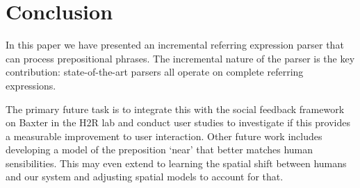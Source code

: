 \documentclass[letterpaper,10pt]{article}
\begin{document}
\section{Conclusion}
In this paper we have presented an incremental referring expression parser that can process prepositional phrases. The incremental nature of the parser is the key contribution: state-of-the-art parsers all operate on complete referring expressions. %

The primary future task is to integrate this with the social feedback framework on Baxter in the H2R lab and conduct user studies to investigate if this provides a measurable improvement to user interaction. Other future work includes developing a model of the preposition `near' that better matches human sensibilities. This may even extend to learning the spatial shift between humans and our system and adjusting spatial models to account for that.

\clearpage
\printbibliography
\end{document}
